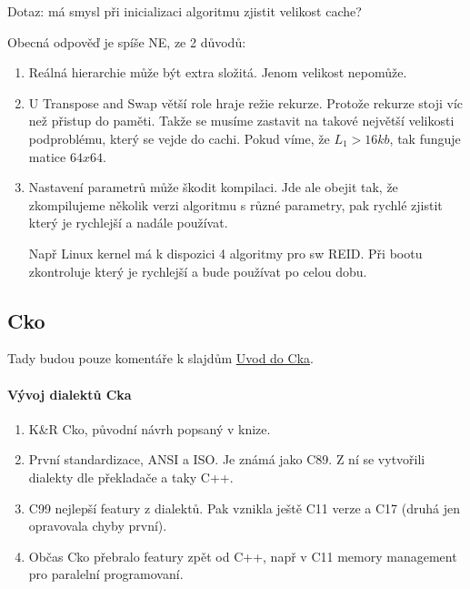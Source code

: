 \begin{note}
	Dotaz: má smysl při inicializaci algoritmu zjistit velikost cache?

	Obecná odpověď je spíše NE, ze 2 důvodů:
	\begin{enumerate}
		\item Reálná hierarchie může být extra složitá. Jenom velikost nepomůže.
		\item U Transpose and Swap větší role hraje režie rekurze.
			Protože rekurze stoji víc než přistup do paměti.
			Takže se musíme zastavit na takové největší velikosti podproblému, který se vejde do cachi.
			Pokud víme, že $L_1 > 16kb$, tak funguje matice $64x64$.
		\item Nastavení parametrů může škodit kompilaci.
			Jde ale obejit tak, že zkompilujeme několik verzi algoritmu s různé parametry, pak rychlé zjistit který je rychlejší a nadále používat.

			Např Linux kernel má k dispozici 4 algoritmy pro sw REID. Při bootu zkontroluje který je rychlejší a bude používat po celou dobu.
	\end{enumerate}
\end{note}

\subsection{Cko}
Tady budou pouze komentáře k slajdům \href{http://mj.ucw.cz/papers/cecko.pdf}{Uvod do Cka}.

\paragraph{Vývoj dialektů Cka}
\begin{enumerate}
	\item K\&R Cko, původní návrh popsaný v knize.
	\item První standardizace, ANSI a ISO.
		Je známá jako C89. Z ní se vytvořili dialekty dle překladače a taky C++.
	\item C99 nejlepší featury z dialektů.
		Pak vznikla ještě C11 verze a C17 (druhá jen opravovala chyby první).
	\item Občas Cko přebralo featury zpět od C++, např v C11 memory management pro paralelní programovaní.
\end{enumerate}

